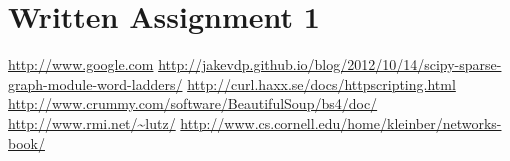 \documentclass[]{svmono}
\begin{document}
\chapter{Written Assignment 1}









\begin{thebibliography}{9}

\url{http://www.google.com}
\url{http://jakevdp.github.io/blog/2012/10/14/scipy-sparse-graph-module-word-ladders/}
\url{http://curl.haxx.se/docs/httpscripting.html}
\url{http://www.crummy.com/software/BeautifulSoup/bs4/doc/}
\url{http://www.rmi.net/~lutz/}
\url{http://www.cs.cornell.edu/home/kleinber/networks-book/}



\end{thebibliography}
















\end{document}
